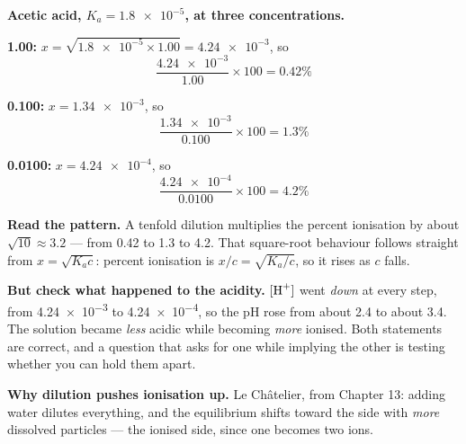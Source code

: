 \documentclass{apchem-worksheet}
\begin{document}
\begin{workedexample}
\textbf{Acetic acid, $K_{a} = \num{1.8e-5}$, at three
concentrations.}

\textbf{\SI{1.00}{\Molar}:} $x = \sqrt{\num{1.8e-5} \times 1.00} =
\num{4.24e-3}$, so
\[ \frac{\num{4.24e-3}}{1.00} \times 100 = \mathbf{0.42\%} \]

\textbf{\SI{0.100}{\Molar}:} $x = \num{1.34e-3}$, so
\[ \frac{\num{1.34e-3}}{0.100} \times 100 = \mathbf{1.3\%} \]

\textbf{\SI{0.0100}{\Molar}:} $x = \num{4.24e-4}$, so
\[ \frac{\num{4.24e-4}}{0.0100} \times 100 = \mathbf{4.2\%} \]

\textbf{Read the pattern.} A tenfold dilution multiplies the percent
ionisation by about $\sqrt{10} \approx 3.2$ --- from 0.42 to 1.3 to 4.2.
That square-root behaviour follows straight from $x = \sqrt{K_{a}c}$:
percent ionisation is $x/c = \sqrt{K_{a}/c}$, so it rises as $c$ falls.

\textbf{But check what happened to the acidity.} $[\ce{H+}]$ went
\emph{down} at every step, from \num{4.24e-3} to \num{4.24e-4}, so the
pH rose from about 2.4 to about 3.4. The solution became \emph{less}
acidic while becoming \emph{more} ionised. Both statements are correct,
and a question that asks for one while implying the other is testing
whether you can hold them apart.

\textbf{Why dilution pushes ionisation up.} Le Ch\^{a}telier, from
Chapter 13: adding water dilutes everything, and the equilibrium shifts
toward the side with \emph{more} dissolved particles --- the ionised
side, since one  becomes two ions.
\end{workedexample}
\end{document}
